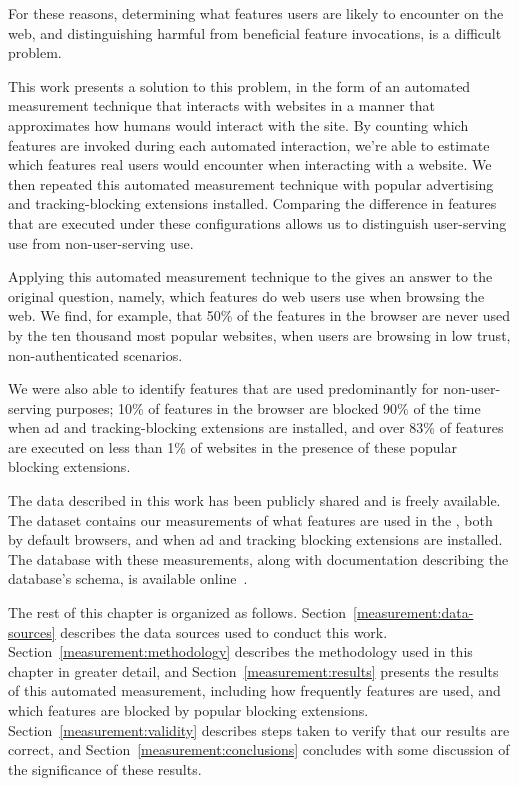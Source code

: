 For these reasons, determining what \WAPI features users are likely
to encounter on the web, and distinguishing harmful from beneficial feature
invocations, is a difficult problem.

This work presents a solution to this problem, in the form of an automated
measurement technique that interacts with websites in a manner that
approximates how humans would interact with the site.  By counting which
features are invoked during each automated interaction, we're able to estimate
which features real users would encounter when interacting with a website. We
then repeated this automated measurement technique with popular advertising and
tracking-blocking extensions installed.  Comparing the difference in
features that are executed under these configurations allows us to
distinguish user-serving \WAPI use from non-user-serving \WAPI use.

Applying this automated measurement technique to the \ATK gives an
answer to the original question, namely, which \WAPI features do web users use when
browsing the web.  We find, for example, that 50\% of the \WAPI features in the
browser are never used by the ten thousand most popular websites, when users
are browsing in low trust, non-authenticated scenarios.

We were also able to identify features that are used
predominantly for non-user-serving purposes; 10\% of \WAPI features in the
browser are blocked 90\% of the time when ad and tracking-blocking extensions
are installed,  and over 83\% of features are executed on less than 1\% of
websites in the presence of these popular blocking extensions.

The data described in this work has been publicly shared and is freely
available.  The dataset contains our measurements of what \JS features are used
in the \ATK, both by default browsers, and when ad and tracking blocking
extensions are installed.  The database with these measurements, along with
documentation describing the database's schema, is available
online~\cite{snyderp2016webapidata}.

The rest of this chapter is organized as follows.
Section~\ref{measurement:data-sources} describes the data sources used to
conduct this work. Section~\ref{measurement:methodology} describes the
methodology used in this chapter in greater detail, and
Section~\ref{measurement:results} presents the results of this automated
measurement, including how frequently features are used, and which features are
blocked by popular blocking extensions.  Section~\ref{measurement:validity}
describes steps taken to verify that our results are correct, and
Section~\ref{measurement:conclusions} concludes with some discussion of the
significance of these results.
